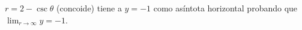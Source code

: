 \item $r = 2 - \csc\theta$ (concoide) tiene a $y = -1$ como asíntota horizontal probando que $\lim_{r\to\infty} y = -1$.
